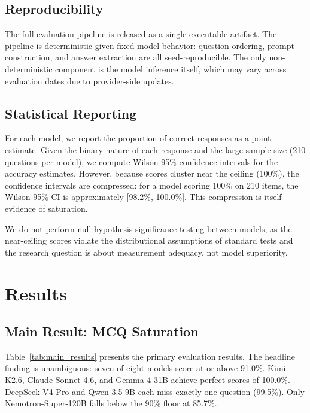 \documentclass[final]{elsarticle}
\begin{document}
\subsection{Reproducibility}

The full evaluation pipeline is released as a single-executable artifact. The pipeline is deterministic given fixed model behavior: question ordering, prompt construction, and answer extraction are all seed-reproducible. The only non-deterministic component is the model inference itself, which may vary across evaluation dates due to provider-side updates.

\subsection{Statistical Reporting}

For each model, we report the proportion of correct responses as a point estimate. Given the binary nature of each response and the large sample size (210 questions per model), we compute Wilson 95\% confidence intervals for the accuracy estimates. However, because scores cluster near the ceiling (100\%), the confidence intervals are compressed: for a model scoring 100\% on 210 items, the Wilson 95\% CI is approximately [98.2\%, 100.0\%]. This compression is itself evidence of saturation.

We do not perform null hypothesis significance testing between models, as the near-ceiling scores violate the distributional assumptions of standard tests and the research question is about measurement adequacy, not model superiority.

\section{Results}

\subsection{Main Result: MCQ Saturation}

Table~\ref{tab:main_results} presents the primary evaluation results. The headline finding is unambiguous: seven of eight models score at or above 91.0\%. Kimi-K2.6, Claude-Sonnet-4.6, and Gemma-4-31B achieve perfect scores of 100.0\%. DeepSeek-V4-Pro and Qwen-3.5-9B each miss exactly one question (99.5\%). Only Nemotron-Super-120B falls below the 90\% floor at 85.7\%.
\end{document}
